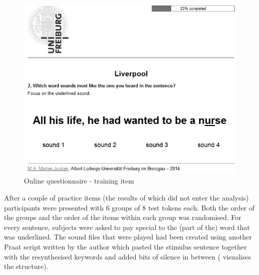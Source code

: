 \begin{figure}
	\includegraphics[width=\textwidth]{./figures/questionnaire_screenshot}
	\caption{Online questionnaire - training item}
	\label{fig.online.screenshot}
\end{figure}

After a couple of practice items (the results of which did not enter the analysis) participants were presented with 6 groups of 8 test tokens each.
Both the order of the groups and the order of the items within each group was randomised.
For every sentence, subjects were asked to pay special  to the (part of the) word that was underlined.
The sound files that were played had been created using another Praat script written by the author which pasted the stimulus sentence together with the resynthesised keywords and added bits of silence in between ( visualises the structure).

